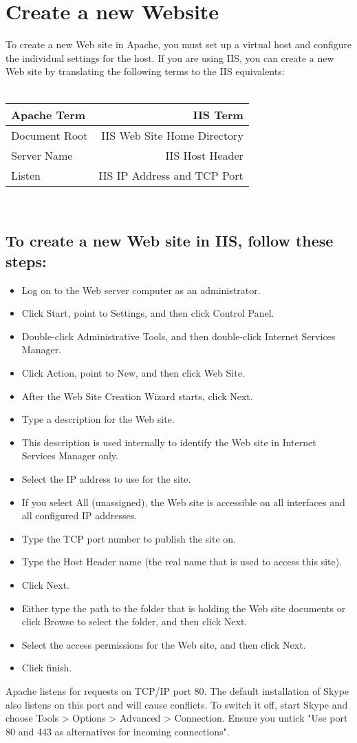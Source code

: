 \section*{Create a new Website}
To create a new Web site in Apache, you must set up a virtual host and configure the individual settings for the host. If you are using IIS, you can create a new Web site by translating the following terms to the IIS equivalents:\\
\\
\begin{tabular}{|l| |r|} \hline
Apache Term & IIS Term \\ \hline
Document Root & IIS Web Site Home Directory \\ \hline
Server Name & IIS Host Header \\ \hline
Listen & IIS IP Address and TCP Port \\ \hline
\end{tabular}\\
\subsection*{To create a new Web site in IIS, follow these steps:}
\begin{itemize}
\item Log on to the Web server computer as an administrator.
\item Click Start, point to Settings, and then click Control Panel.
\item Double-click Administrative Tools, and then double-click Internet Services Manager.
\item Click Action, point to New, and then click Web Site.
\item After the Web Site Creation Wizard starts, click Next.
\item Type a description for the Web site.
\item This description is used internally to identify the Web site in Internet Services Manager only.
\item Select the IP address to use for the site.
\item If you select All (unassigned), the Web site is accessible on all interfaces and all configured IP addresses.
\item Type the TCP port number to publish the site on.
\item Type the Host Header name (the real name that is used to access this site).
\item Click Next.
\item Either type the path to the folder that is holding the Web site documents or click Browse to select the folder, and then click Next.
\item Select the access permissions for the Web site, and then click Next.
\item Click finish.
\end{itemize}
Apache listens for requests on TCP/IP port 80. The default installation of Skype also listens on this port and will cause conflicts. To switch it off, start Skype and choose Tools > Options > Advanced > Connection. Ensure you untick "Use port 80 and 443 as alternatives for incoming connections".


